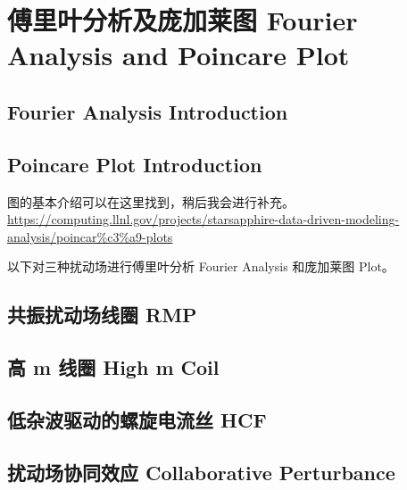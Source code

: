 \chapter{傅里叶分析及庞加莱图 Fourier Analysis and Poincare Plot}

\section{Fourier Analysis Introduction}

\section{Poincare Plot Introduction}
\Poincare 图的基本介绍可以在这里找到，稍后我会进行补充。
\url{https://computing.llnl.gov/projects/starsapphire-data-driven-modeling-analysis/poincar%c3%a9-plots}



以下对三种扰动场进行傅里叶分析 Fourier Analysis 和庞加莱图 \Poincare Plot。
\section{共振扰动场线圈 RMP}
\section{高 m 线圈 High m Coil}
\section{低杂波驱动的螺旋电流丝 HCF}
\section{扰动场协同效应 Collaborative Perturbance}